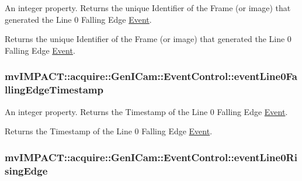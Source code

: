 An integer property. Returns the unique Identifier of the Frame (or image) that generated the Line 0 Falling Edge \hyperlink{classmv_i_m_p_a_c_t_1_1acquire_1_1_event}{Event}. 

Returns the unique Identifier of the Frame (or image) that generated the Line 0 Falling Edge \hyperlink{classmv_i_m_p_a_c_t_1_1acquire_1_1_event}{Event}. \hypertarget{classmv_i_m_p_a_c_t_1_1acquire_1_1_gen_i_cam_1_1_event_control_a1d4af28ff2fc46952a9219eb3b182f27}{
\subsubsection[{event\+Line0\+Falling\+Edge\+Timestamp}]{ mv\+I\+M\+P\+A\+C\+T\+::acquire\+::\+Gen\+I\+Cam\+::\+Event\+Control\+::event\+Line0\+Falling\+Edge\+Timestamp}}\label{classmv_i_m_p_a_c_t_1_1acquire_1_1_gen_i_cam_1_1_event_control_a1d4af28ff2fc46952a9219eb3b182f27}


An integer property. Returns the Timestamp of the Line 0 Falling Edge \hyperlink{classmv_i_m_p_a_c_t_1_1acquire_1_1_event}{Event}. 

Returns the Timestamp of the Line 0 Falling Edge \hyperlink{classmv_i_m_p_a_c_t_1_1acquire_1_1_event}{Event}. \hypertarget{classmv_i_m_p_a_c_t_1_1acquire_1_1_gen_i_cam_1_1_event_control_a82796909493c32b1aac1566abc44812d}{
\subsubsection[{event\+Line0\+Rising\+Edge}]{ mv\+I\+M\+P\+A\+C\+T\+::acquire\+::\+Gen\+I\+Cam\+::\+Event\+Control\+::event\+Line0\+Rising\+Edge}}\label{classmv_i_m_p_a_c_t_1_1acquire_1_1_gen_i_cam_1_1_event_control_a82796909493c32b1aac1566abc44812d}


